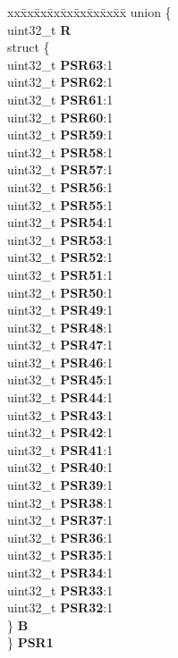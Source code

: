 \begin{DoxyCompactItemize}
\begin{tabbing}
\end{tabbing}\item 
\mbox{\label{structADC__tag_a02757bc438b2095ee579b3cc748b2812}} 
\begin{tabbing}
xx\=xx\=xx\=xx\=xx\=xx\=xx\=xx\=xx\=\kill
union \{\\
\>uint32\_t {\bfseries R}\\
\>struct \{\\
\>\>uint32\_t {\bfseries PSR63}:1\\
\>\>uint32\_t {\bfseries PSR62}:1\\
\>\>uint32\_t {\bfseries PSR61}:1\\
\>\>uint32\_t {\bfseries PSR60}:1\\
\>\>uint32\_t {\bfseries PSR59}:1\\
\>\>uint32\_t {\bfseries PSR58}:1\\
\>\>uint32\_t {\bfseries PSR57}:1\\
\>\>uint32\_t {\bfseries PSR56}:1\\
\>\>uint32\_t {\bfseries PSR55}:1\\
\>\>uint32\_t {\bfseries PSR54}:1\\
\>\>uint32\_t {\bfseries PSR53}:1\\
\>\>uint32\_t {\bfseries PSR52}:1\\
\>\>uint32\_t {\bfseries PSR51}:1\\
\>\>uint32\_t {\bfseries PSR50}:1\\
\>\>uint32\_t {\bfseries PSR49}:1\\
\>\>uint32\_t {\bfseries PSR48}:1\\
\>\>uint32\_t {\bfseries PSR47}:1\\
\>\>uint32\_t {\bfseries PSR46}:1\\
\>\>uint32\_t {\bfseries PSR45}:1\\
\>\>uint32\_t {\bfseries PSR44}:1\\
\>\>uint32\_t {\bfseries PSR43}:1\\
\>\>uint32\_t {\bfseries PSR42}:1\\
\>\>uint32\_t {\bfseries PSR41}:1\\
\>\>uint32\_t {\bfseries PSR40}:1\\
\>\>uint32\_t {\bfseries PSR39}:1\\
\>\>uint32\_t {\bfseries PSR38}:1\\
\>\>uint32\_t {\bfseries PSR37}:1\\
\>\>uint32\_t {\bfseries PSR36}:1\\
\>\>uint32\_t {\bfseries PSR35}:1\\
\>\>uint32\_t {\bfseries PSR34}:1\\
\>\>uint32\_t {\bfseries PSR33}:1\\
\>\>uint32\_t {\bfseries PSR32}:1\\
\>\} {\bfseries B}\\
\} {\bfseries PSR1}\\


\end{tabbing}
\end{DoxyCompactItemize}
